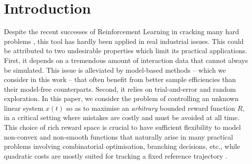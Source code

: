 \documentclass{article}
\begin{document}
\section{Introduction}

Despite the recent successes of Reinforcement Learning in cracking many hard problems \citep[e.g.][]{mnih2015humanlevel,Silver1140}, this tool has hardly been applied in real industrial issues. This could be attributed to two undesirable properties which limit its practical applications. First, it depends on a tremendous amount of interaction data that cannot always be simulated. This issue is alleviated by model-based methods -- which we consider in this work -- that often benefit from better sample efficiencies than their model-free counterparts. Second, it relies on trial-and-error and random exploration. In this paper, we consider the problem of controlling an unknown linear system $x(t)$ so as to maximise an \emph{arbitrary} bounded reward function $R$, in a critical setting where mistakes are costly and must be avoided at all time. 
This choice of rich reward space is crucial to have sufficient flexibility to model non-convex and non-smooth functions that naturally arise in many practical problems involving combinatorial optimisation, branching decisions, etc., while quadratic costs are mostly suited for tracking a fixed reference trajectory \citep[e.g.][]{Kumar2013}.
\end{document}
